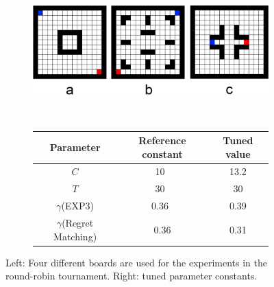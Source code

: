 \documentclass{article}
\begin{document}

\begin{figure}
\centering 

\hspace{-2.7cm}\begin{subfigure}[c]{0.5\textwidth}
\centering
\includegraphics[width=\textwidth]{images/boards.png} 
\end{subfigure}
~
\begin{subfigure}[c]{0.3\textwidth}
\centering
\footnotesize
\begin{tabular}{|c||c|c|}
							\hline
Parameter			& Reference constant		& Tuned value	\\ \hline\hline
$C$				& 10~\cite{teuling_tron}	& 13.2		\\ \hline
$T$				& 30~\cite{teuling_tron}	& 30		\\ \hline
$\gamma$(EXP3)			& 0.36~\cite{cig_paper}		& 0.39		\\ \hline
$\gamma$(Regret Matching)	& 0.36				& 0.31		\\ \hline
\end{tabular}
\end{subfigure}
\caption{Left: Four different boards are used for the experiments in the round-robin tournament. Right: tuned parameter constants. \label{fig:boards_parms}}
\end{figure}
\end{document}
